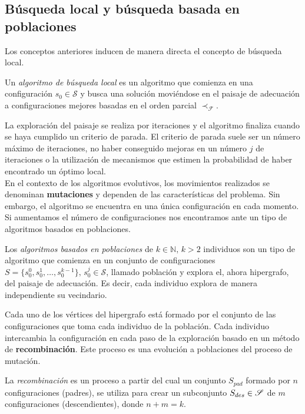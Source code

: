\subsection{Búsqueda local y búsqueda basada en poblaciones}
Los conceptos anteriores inducen de manera directa el concepto de búsqueda local.

\begin{definition}
    Un \textit{algoritmo de búsqueda local} es un algoritmo que comienza en una configuración $s_0\in\mathcal{S}$ y busca una solución moviéndose en el paisaje de adecuación a configuraciones mejores basadas en el orden parcial $\prec_\mathscr{F}$.
\end{definition}

La exploración del paisaje se realiza por iteraciones y el algoritmo finaliza cuando se haya cumplido un criterio de parada. El criterio de parada suele ser un número máximo de iteraciones, no haber conseguido mejoras en un número $j$ de iteraciones o la utilización de mecanismos que estimen la probabilidad de haber encontrado un óptimo local.\\

En el contexto de los algoritmos evolutivos, los movimientos realizados se denominan \textbf{mutaciones} y dependen de las características del problema. Sin embargo, el algoritmo se encuentra en una única configuración en cada momento. Si aumentamos el número de configuraciones nos encontramos ante un tipo de algoritmos basados en poblaciones.

\begin{definition}
    Los \textit{algoritmos basados en poblaciones} de $k\in\mathbb{N},\,k>2$ individuos son un tipo de algoritmo que comienza en un conjunto de configuraciones $S=\{s_0^0,s_0^1,\ldots,s_0^{k-1}\},\, s_0^j\in\mathcal{S}$, llamado población y explora el, ahora hipergrafo, del paisaje de adecuación. Es decir, cada individuo explora de manera independiente su vecindario.
\end{definition}

Cada uno de los vértices del hipergrafo está formado por el conjunto de las configuraciones que toma cada individuo de la población. Cada individuo intercambia la configuración en cada paso de la exploración basado en un método de \textbf{recombinación}. Este proceso es una evolución a poblaciones del proceso de mutación.

\begin{definition}\label{def:recombinacion}
    La \textit{recombinación} es un proceso a partir del cual un conjunto $S_{pad}$ formado por $n$ configuraciones (padres), se utiliza para crear un subconjunto $S_{des}\in\mathscr{S}$ de $m$ configuraciones (descendientes), donde $n+m=k$. 
\end{definition}

